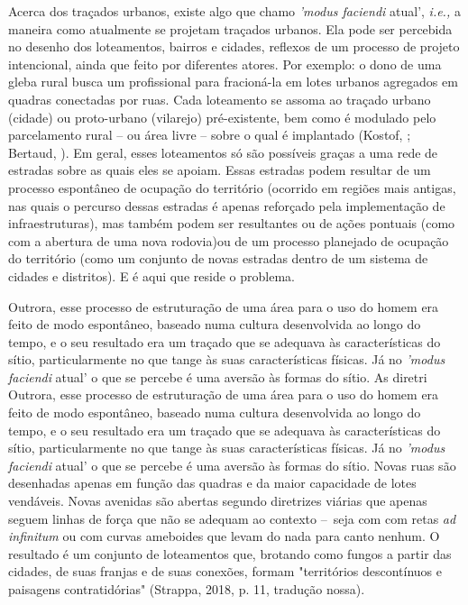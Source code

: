 \documentclass[]{report}
\begin{document}
    Acerca dos traçados urbanos, existe algo que chamo \textit{'modus faciendi} atual', \textit{i.e.,} a maneira como atualmente se projetam traçados urbanos. Ela pode ser percebida no desenho dos loteamentos, bairros e cidades, reflexos de um processo de projeto intencional, ainda que feito por diferentes atores. Por exemplo: o dono de uma gleba rural busca um profissional para fracioná-la em lotes urbanos agregados em quadras conectadas por ruas. Cada loteamento se assoma ao traçado urbano (cidade) ou proto-urbano (vilarejo) pré-existente, bem como é modulado pelo parcelamento rural – ou área livre – sobre o qual é implantado (Kostof, ; Bertaud, ). Em geral, esses loteamentos só são possíveis graças a uma rede de estradas sobre as quais eles se apoiam. Essas estradas podem  resultar de um processo espontâneo de ocupação do território (ocorrido em regiões mais antigas, nas quais o percurso dessas estradas é apenas reforçado pela implementação de infraestruturas), mas também podem ser resultantes ou de ações pontuais (como com a abertura de uma nova rodovia)ou de um processo planejado de ocupação do território (como um conjunto de novas estradas dentro de um sistema de cidades e distritos). E é aqui que reside o problema. 
    
    Outrora, esse processo de estruturação de uma área para o uso do homem era feito de modo espontâneo, baseado numa cultura desenvolvida ao longo do tempo, e o seu resultado era um traçado que se adequava às características do sítio, particularmente no que tange às suas características físicas. Já no \textit{'modus faciendi} atual' o que se percebe é uma aversão às formas do sítio. As diretri
    Outrora, esse processo de estruturação de uma área para o uso do homem era feito de modo espontâneo, baseado numa cultura desenvolvida ao longo do tempo, e o seu resultado era um traçado que se adequava às características do sítio, particularmente no que tange às suas características físicas. Já no \textit{'modus faciendi} atual' o que se percebe é uma aversão às formas do sítio. Novas ruas são desenhadas apenas em função das quadras e da maior capacidade de lotes vendáveis. Novas avenidas são abertas segundo diretrizes viárias que apenas seguem linhas de força que não se adequam ao contexto – seja com com retas \textit{ad infinitum} ou com curvas ameboides que levam do nada para canto nenhum. O resultado é um conjunto de loteamentos que, brotando como fungos a partir das cidades, de suas franjas e de suas conexões, formam "territórios descontínuos e paisagens contratidórias" (Strappa, 2018, p. 11, tradução nossa).
\end{document}
